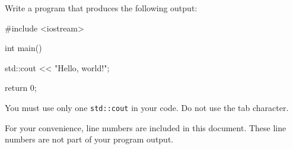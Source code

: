 Write a program that produces the following output:
\begin{console}[numbers=left]
#include <iostream>

int main()
{
    std::cout << "Hello, world!\n";

    return 0;
}

\end{console}
You must use only one 
\verb!std::cout! in your code. Do not use the tab character. 

For your convenience, line numbers are included in this document.
These line numbers are not part of your program output.
